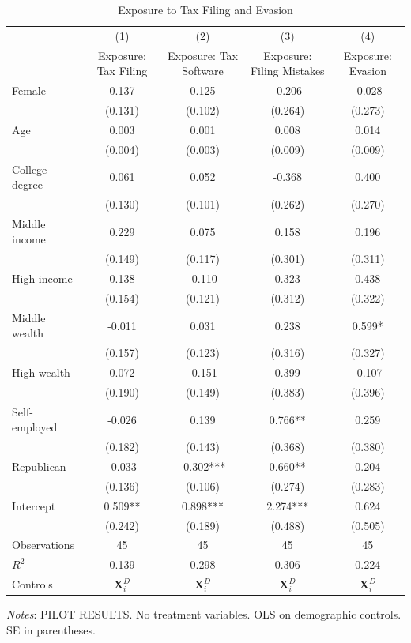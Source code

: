 \documentclass[11pt]{article}
\begin{document}
\FloatBarrier
\begin{table}[!htbp]\centering
\caption{Exposure to Tax Filing and Evasion}
\label{tab:exposure}
\begin{threeparttable}
\footnotesize
\begin{tabular}{lcccc}
\toprule
& (1) & (2) & (3) & (4) \\
& Exposure: Tax Filing & Exposure: Tax Software & Exposure: Filing Mistakes & Exposure: Evasion \\
\midrule
Female & 0.137 & 0.125 & -0.206 & -0.028 \\
 & (0.131) & (0.102) & (0.264) & (0.273) \\
Age & 0.003 & 0.001 & 0.008 & 0.014 \\
 & (0.004) & (0.003) & (0.009) & (0.009) \\
College degree & 0.061 & 0.052 & -0.368 & 0.400 \\
 & (0.130) & (0.101) & (0.262) & (0.270) \\
Middle income & 0.229 & 0.075 & 0.158 & 0.196 \\
 & (0.149) & (0.117) & (0.301) & (0.311) \\
High income & 0.138 & -0.110 & 0.323 & 0.438 \\
 & (0.154) & (0.121) & (0.312) & (0.322) \\
Middle wealth & -0.011 & 0.031 & 0.238 & 0.599* \\
 & (0.157) & (0.123) & (0.316) & (0.327) \\
High wealth & 0.072 & -0.151 & 0.399 & -0.107 \\
 & (0.190) & (0.149) & (0.383) & (0.396) \\
Self-employed & -0.026 & 0.139 & 0.766** & 0.259 \\
 & (0.182) & (0.143) & (0.368) & (0.380) \\
Republican & -0.033 & -0.302*** & 0.660** & 0.204 \\
 & (0.136) & (0.106) & (0.274) & (0.283) \\
Intercept & 0.509** & 0.898*** & 2.274*** & 0.624 \\
 & (0.242) & (0.189) & (0.488) & (0.505) \\
\midrule
Observations & 45 & 45 & 45 & 45 \\
$R^2$ & 0.139 & 0.298 & 0.306 & 0.224 \\
Controls & $\mathbf{X}_{i}^{D}$ & $\mathbf{X}_{i}^{D}$ & $\mathbf{X}_{i}^{D}$ & $\mathbf{X}_{i}^{D}$ \\
\bottomrule
\end{tabular}
\begin{tablenotes}[flushleft]
\footnotesize
\item \textit{Notes}: PILOT RESULTS. No treatment variables. OLS on demographic controls. SE in parentheses.
\end{tablenotes}
\end{threeparttable}
\end{table}

\FloatBarrier
\end{document}
